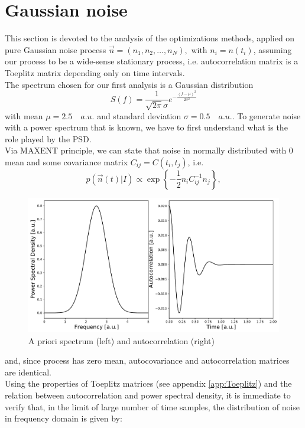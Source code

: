 \documentclass[twocolumn,showpacs,preprintnumbers,nofootinbib,prd,
superscriptaddress,10pt]{revtex4-1}
\begin{document}
\section{Gaussian noise} 
This section is devoted to the analysis of the optimizations methods, applied on pure Gaussian noise process $\vec n = (n_1, n_2, \dots, n_N),\text{ with } n_i = n(t_i)$, assuming our process to be a wide-sense stationary process, i.e. autocorrelation matrix is a Toeplitz matrix depending only on time intervals.\\ 
The spectrum chosen for our first analysis is a Gaussian distribution
\begin{equation}
    \nonumber
    S(f) = \frac{1}{\sqrt{2 \pi} \sigma}e^{-\frac{(f - \mu)^2}{2 \sigma ^2}}
\end{equation}
with mean $\mu =2.5 \quad a.u.$ and standard deviation $\sigma =  0.5 \quad  a.u.$. 
To generate noise with a power spectrum that is known, we have to first understand what is the role played by the PSD. \\ 
Via MAXENT principle, we can state that noise in normally distributed with 0 mean and some covariance matrix $C_{ij} = C(t_i, t_j)$, i.e.
\begin{equation}
    \nonumber
    p(\vec{n}(t) \vert I) \propto \exp{\left\{-\frac{1}{2}n_i C^{-1}_{ij}n_j\right\}},
\end{equation}
\begin{figure}
    \centering
        \includegraphics[width = \linewidth]{Images/Noise and PSD/NormalPSDautocorr.pdf}
        \caption{A priori spectrum (left) and autocorrelation (right)}
        \label{fig:autocorr}
\end{figure}and, since process has zero mean, autocovariance and autocorrelation matrices are identical. \\ 
Using the properties of Toeplitz matrices (see appendix \ref{app:Toeplitz}) and the relation between autocorrelation and power spectral density, it is immediate to verify that, in the limit of large number of time samples, the distribution of noise in frequency domain is given by:
\end{document}
